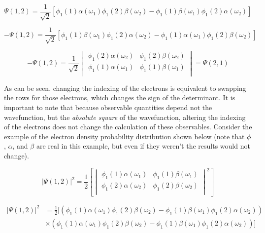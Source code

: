 \documentclass[12pt]{report}
\begin{document}
\begin{equation}
\label{eq:pauli_2t_2}
\Psi(1,2) =
\frac{1}{\sqrt{2}}
\left[
\phi_{1}(1)\alpha(\omega_{1})\phi_{1}(2)\beta(\omega_{2}) -
\phi_{1}(1)\beta(\omega_{1})\phi_{1}(2)\alpha(\omega_{2})
\right]
\end{equation}

\begin{equation}
\label{eq:pauli_2t_3}
-\Psi(1,2) =
\frac{1}{\sqrt{2}}
\left[
\phi_{1}(1)\beta(\omega_{1})\phi_{1}(2)\alpha(\omega_{2}) -
\phi_{1}(1)\alpha(\omega_{1})\phi_{1}(2)\beta(\omega_{2})
\right]
\end{equation}

\begin{equation}
\label{eq:pauli_2t_4}
-\Psi(1,2) =
\frac{1}{\sqrt{2}}
\begin{vmatrix}
\phi_{1}(2)\alpha(\omega_{2})	&	\phi_{1}(2)\beta(\omega_{2})	\\
\phi_{1}(1)\alpha(\omega_{1})	&	\phi_{1}(1)\beta(\omega_{1})	\\
\end{vmatrix}
=\Psi(2,1)
\end{equation}

As can be seen, changing the indexing of the electrons is equivalent to swapping the rows for those electrons, which changes the sign of the determinant. It is important to note that because observable quantities depend not the wavefunction, but the \textit{absolute square} of the wavefunction, altering the indexing of the electrons does not change the calculation of these observables. Consider the example of the electron density probability distribution shown below (note that $\phi$, $\alpha$, and $\beta$ are real in this example, but even if they weren't the results would not change).

\begin{equation}
\label{eq:el_prob_dist_1}
|\Psi(1,2)|^{2} =
\frac{1}{2}\left[
\begin{vmatrix}
\phi_{1}(1)\alpha(\omega_{1})		&	\phi_{1}(1)\beta(\omega_{1})		\\
\phi_{1}(2)\alpha(\omega_{2})		&	\phi_{1}(2)\beta(\omega_{2})		\\
\end{vmatrix}^2
\right]
\end{equation}

\begin{equation}
\label{eq:el_prob_dist_2}
\begin{split}
|\Psi(1,2)|^{2}	&	=
\frac{1}{2}
[
\left(
\phi_{1}(1)\alpha(\omega_{1})\phi_{1}(2)\beta(\omega_{2}) -
\phi_{1}(1)\beta(\omega_{1})\phi_{1}(2)\alpha(\omega_{2})
\right)	\\
	&	\times\left(
\phi_{1}(1)\alpha(\omega_{1})\phi_{1}(2)\beta(\omega_{2}) -
\phi_{1}(1)\beta(\omega_{1})\phi_{1}(2)\alpha(\omega_{2})
\right)
]
\end{split}
\end{equation}
\end{document}
